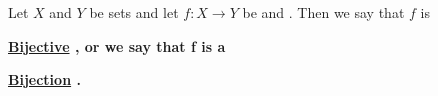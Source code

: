 \newcommand{\Bijective}[0]{
    \bf \hyperref[def:Bijective]{Bijective} \rm
}
\newcommand{\Bijectivity}[0]{
    \bf \hyperref[def:Bijective]{Bijectivity} \rm
}
\newcommand{\Bijection}[0]{
    \bf \hyperref[def:Bijective]{Bijection} \rm
}
\newcommand{\Bijections}[0]{
    \bf \hyperref[def:Bijective]{Bijections} \rm
}\begin{df}[Bijective]
\label{def:Bijective}

\rm
    Let $X$ and $Y$ be sets and let 
    $f:X \to Y$ be \Surjective and \Injective. 
    Then we say that $f$ is 
    \Bijective, or we say that f is a 
    \Bijection. 
\end{df}
